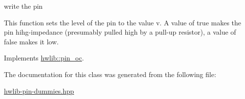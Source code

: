 write the pin 

This function sets the level of the pin to the value v. A value of true makes the pin hihg-\/impedance (presumably pulled high by a pull-\/up resistor), a value of false makes it low. 

Implements \hyperlink{classhwlib_1_1pin__oc_a2165622dad253a423d2fa52cbed7c553}{hwlib\+::pin\+\_\+oc}.



The documentation for this class was generated from the following file\+:\begin{DoxyCompactItemize}
\item 
\hyperlink{hwlib-pin-dummies_8hpp}{hwlib-\/pin-\/dummies.\+hpp}\end{DoxyCompactItemize}
